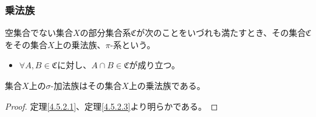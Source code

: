 \documentclass[dvipdfmx]{jsarticle}
\begin{document}
\subsubsection{乗法族}%
\begin{axs}[乗法族の公理]
空集合でない集合$X$の部分集合系$\mathfrak{C}$が次のことをいづれも満たすとき、その集合$\mathfrak{C}$をその集合$X$上の乗法族、$\pi$-系という。
\begin{itemize}
\item
  $\forall A,B \in \mathfrak{C}$に対し、$A \cap B \in \mathfrak{C}$が成り立つ。
\end{itemize}
\end{axs}
\begin{thm}\label{4.5.6.14}
集合$X$上の$\sigma$-加法族はその集合$X$上の乗法族である。
\end{thm}
\begin{proof} 定理\ref{4.5.2.1}、定理\ref{4.5.2.3}より明らかである。
\end{proof}
\end{document}
